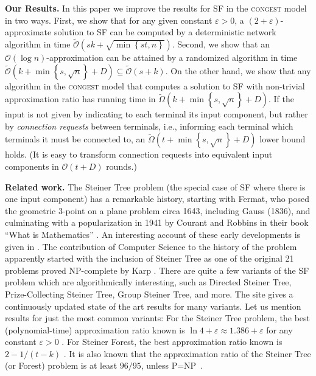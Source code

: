 \documentclass[letterpaper,11pt]{article}
\newcommand{\BO}{\mathcal{O}}
\newcommand{\sO}{\tilde{\mathcal{O}}}
\newcommand{\sOmega}{\tilde{\Omega}}
\newcommand{\Set}[1]{\left\{#1\right\}}
\newcommand{\Congest}{\textsc{congest}\xspace}
\renewcommand{\paragraph}[1]{\smallskip\par\noindent\textbf{#1}}
\begin{document}
\paragraph{Our Results.}
In this paper we improve the results for SF in the \Congest model in two ways.
First, we show that for any given constant $\varepsilon>0$, a
$(2+\varepsilon)$-approximate solution to SF can be computed by a deterministic
network algorithm in time $\sO(sk+\sqrt{\min\Set{st,n}})$.
Second, we show that an $\BO(\log n)$-approximation can be attained by a
randomized algorithm in time $\sO(k+\min\Set{s,\sqrt n}+D)\subseteq\sO(s+k)$.
On the other hand, we show that any algorithm in the \Congest model that
computes a solution to SF with non-trivial approximation ratio has running time
in $\sOmega(k+\min\Set{s,\sqrt n}+D)$. If the input is not given by
indicating to each terminal its input component, but rather by
\emph{connection
requests} between terminals, i.e., informing each terminal which
terminals  it must be
connected to, an  $\sOmega(t+\min\Set{s,\sqrt n}+D)$ lower bound
holds.  (It is easy to transform connection requests into equivalent
input components in $\BO(t+D)$ rounds.)


\paragraph{Related work.}
The Steiner Tree problem (the special case of SF where there is one
input component) has a remarkable history, starting with Fermat, who
posed the geometric 3-point on a plane problem circa 1643, including
Gauss (1836), and culminating with a popularization in 1941 by Courant
and Robbins in their book ``What is Mathematics'' \cite{CourantR-41}. An
interesting account of these early developments is given in
\cite{SteinerHistory}.
The contribution of Computer Science to the history of the problem apparently
started with the inclusion of Steiner Tree as one of the original 21 problems
proved NP-complete by Karp \cite{Karp-72}. There are quite a few variants of the
SF problem which are algorithmically interesting, such as Directed Steiner Tree,
Prize-Collecting Steiner Tree, Group Steiner Tree, and more. The site
\cite{Steiner-site} gives a continuously updated state of the
art results for many variants. Let us mention results for just the most common
variants: For the Steiner Tree problem, the best (polynomial-time) approximation
ratio known is $\ln 4+\varepsilon\approx1.386+\varepsilon$ for any constant
$\varepsilon>0$ \cite{ByrkaGRS-10}. For Steiner Forest, the best approximation
ratio known is $2-1/(t-k)$ \cite{AgrawalKR-95}. It is also known that the
approximation ratio of the Steiner Tree (or Forest) problem is  at least
$96/95$, unless P=NP~\cite{ChlebikC-08}.
\end{document}
